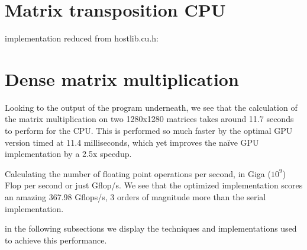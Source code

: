 \documentclass[a4paper,10pt]{article}
\begin{document}
\newpage

\section{Matrix transposition CPU} implementation reduced from hostlib.cu.h:
\newpage
\section{Dense matrix multiplication}
Looking to the output of the program underneath, we see that the calculation of the matrix multiplication on two 1280x1280 matrices takes around 11.7 seconds to perform for the CPU.
This is performed so much faster by the optimal GPU version timed at 11.4 milliseconds, which yet improves the naïve GPU implementation by a 2.5x speedup.

Calculating the number of floating point operations per second, in Giga ($10^9$) Flop per second or just Gflop/s.
We see that the optimized implementation scores an amazing 367.98 Gflops/s, 3 orders of magnitude more than the serial implementation.

in the following subsections we display the techniques and implementations used to achieve this performance.
\end{document}
